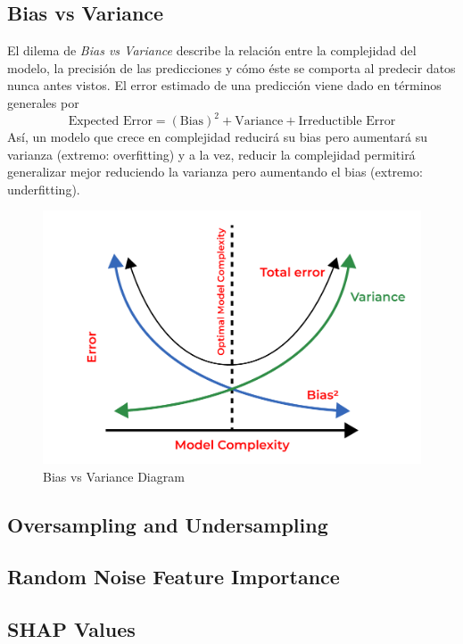 \subsection{Bias vs Variance}

El dilema de \textit{Bias vs Variance} describe la relación entre la complejidad del modelo, la precisión de las predicciones y cómo éste se comporta al predecir datos nunca antes vistos. El error estimado de una predicción viene dado en términos generales por 
$$
\text{Expected Error} = (\text{Bias})^2 + \text{Variance} + \text{Irreductible Error}
$$
Así, un modelo que crece en complejidad reducirá su bias pero aumentará su varianza (extremo: overfitting) y a la vez, reducir la complejidad permitirá generalizar mejor reduciendo la varianza pero aumentando el bias (extremo: underfitting). 

\begin{figure}[H]
    \center
    \includegraphics[scale=0.25]{notebooks/Others/img/bias_vs_variance.png}
    \caption{Bias vs Variance Diagram}
\end{figure}

\subsection{Oversampling and Undersampling}

\subsection{Random Noise Feature Importance}

\subsection{SHAP Values}
\label{subsec:shap_values}

